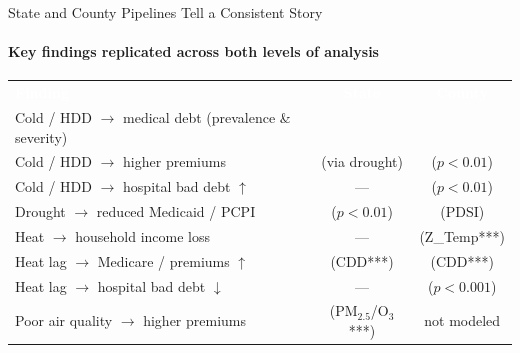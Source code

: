 \documentclass[aspectratio=169,11pt]{beamer}
\newcommand{\tealtext}[1]{{\color{Teal}#1}}
\newcommand{\graytext}[1]{{\color{WarmGray}#1}}
\begin{document}
\begin{frame}{State and County Pipelines Tell a Consistent Story}
  \framesubtitle{Key findings replicated across both levels of analysis}
  \begin{center}
  \small
  \renewcommand{\arraystretch}{1.5}
  \begin{tabular}{lcc}
    \rowcolor{DeepNavy}
    \textcolor{white}{\textbf{Finding}} &
    \textcolor{white}{\textbf{State}} &
    \textcolor{white}{\textbf{County}} \\
    \rowcolor{Teal!10}
    Cold / HDD $\to$ medical debt (prevalence \& severity) &
    \tealtext{\textbf{\checkmark}} & \tealtext{\textbf{\checkmark}} \\
    Cold / HDD $\to$ higher premiums &
    \tealtext{\textbf{\checkmark}} \graytext{\scriptsize(via drought)} & \tealtext{\textbf{\checkmark}} \graytext{\scriptsize($p{<}0.01$)} \\
    \rowcolor{Teal!10}
    Cold / HDD $\to$ hospital bad debt $\uparrow$ &
    \graytext{---} & \tealtext{\textbf{\checkmark}} \graytext{\scriptsize($p{<}0.01$)} \\
    Drought $\to$ reduced Medicaid / PCPI &
    \tealtext{\textbf{\checkmark}} \graytext{\scriptsize($p{<}0.01$)} & \tealtext{\textbf{\checkmark}} \graytext{\scriptsize(PDSI)} \\
    \rowcolor{Teal!10}
    Heat $\to$ household income loss &
    \graytext{---} & \tealtext{\textbf{\checkmark}} \graytext{\scriptsize(Z\_Temp***)} \\
    Heat lag $\to$ Medicare / premiums $\uparrow$ &
    \tealtext{\textbf{\checkmark}} \graytext{\scriptsize(CDD***)} & \tealtext{\textbf{\checkmark}} \graytext{\scriptsize(CDD***)} \\
    \rowcolor{Teal!10}
    Heat lag $\to$ hospital bad debt $\downarrow$ &
    \graytext{---} & \tealtext{\textbf{\checkmark}} \graytext{\scriptsize($p{<}0.001$)} \\
    Poor air quality $\to$ higher premiums &
    \tealtext{\textbf{\checkmark}} \graytext{\scriptsize(PM$_{2.5}$/O$_3$***)} & \graytext{\scriptsize not modeled} \\
  \end{tabular}
  \end{center}
\end{frame}
\end{document}
